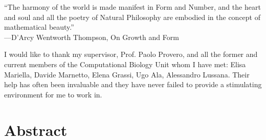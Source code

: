 \documentclass[a4paper,oneside,marginals=justified,nobib]{tufte-book}
\begin{document}
\cleardoublepage
\null{}
\begin{doublespace}
\noindent\fontsize{15}{15}\selectfont\itshape
\nohyphenation

\enquote{The harmony of the world is made manifest in Form and Number, 
	and the heart and soul and all the poetry of Natural Philosophy are 
	embodied in the concept of mathematical beauty.}\\
---D'Arcy Wentworth Thompson, \textnormal{On Growth and Form}


\noindent\fontsize{15}{15}\selectfont\itshape

I would like to thank my supervisor, Prof. Paolo Provero, and all the 
former and current members of the Computational Biology Unit whom I have 
met: Elisa Mariella, Davide Marnetto, Elena Grassi, Ugo Ala, Alessandro 
Lussana. Their help has often been invaluable and they have never failed 
to provide a stimulating environment for me to work in.

\end{doublespace}
\null


\cleardoublepage
\chapter{Abstract} %
\end{document}
